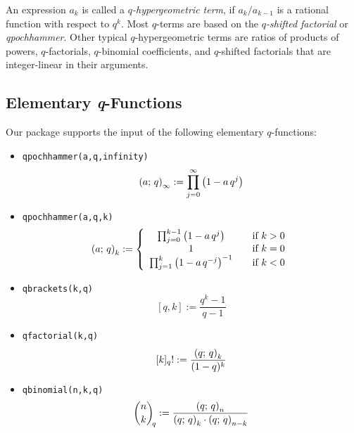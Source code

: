 An expression $a_k$ is called a \textsl{$q$-hypergeometric term}, if
$a_{k}/a_{k-1}$ is a rational function with respect to $q^k$. Most
$q$-terms are based on the \textsl{$q$-shifted factorial} or
\textsl{qpochhammer}. Other typical $q$-hypergeometric terms are ratios
of products of powers, $q$-factorials, $q$-binomial coefficients, and
$q$-shifted factorials that are integer-linear in their arguments.


\subsection{Elementary \textsl{q}-Functions}

Our package supports the input of the following elementary
$q$-functions:
\begin{itemize}
%
\item \texttt{qpochhammer(a,q,infinity)}\[
	\left(a;\,q\right)_{\infty}:= \prod_{j=0}^{\infty}{\left(1-a\,q^j\right)}
	\]
\item \texttt{qpochhammer(a,q,k)} \[
	\left(a;\,q\right)_{k}:=
         \left\{\begin{array}{ccc}
           \prod_{j=0}^{k-1}{\left(1-a\,q^j\right)} && \mbox{if $k>0$} \\
           1 && \mbox{if $k=0$} \\
           \prod_{j=1}^{k}{\left(1-a\,q^{-j}\right)^{-1}} && \mbox{if $k<0$}
         \end{array}\right.
	\]
\item  \texttt{qbrackets(k,q)}
	\[  {}[q,k]:=\frac{q^k-1}{q-1}  \]
\item  \texttt{qfactorial(k,q)}
	\[   {}[k]_q!:= \frac{\left(q;\,q\right)_{k}}{(1-q)^k}  \]
\item  \texttt{qbinomial(n,k,q)}
	\[  {\binom{n}{k}\!}_q:=
		\frac{\left(q;\,q\right)_{n}}{\left(q;\,q\right)_{k}\cdot\left(q;\,q\right)_{n-k}} \]
\end{itemize}

